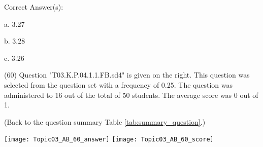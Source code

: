 \documentclass[12pt,english,nohyper]{tufte-handout}\usepackage[]{graphicx}\usepackage[]{color}
\begin{document}
{Correct Answer(s):



a. 3.27



b. 3.28



c. 3.26 

} (60) Question "T03.K.P.04.1.1.FB.sd4" is given on the right. This question was selected from the question set with a frequency of 0.25. The question was administered to 16 out of the total of 50 students. The average score was 0 out of 1.

 (Back to the question summary Table \ref{tab:summary_question}.)

\begin{center} \texttt{[image: Topic03\_AB\_60\_answer]} \texttt{[image: Topic03\_AB\_60\_score]} \end{center} 
\end{document}
